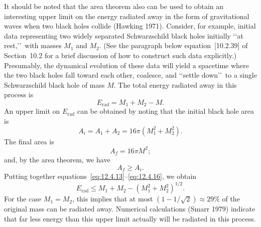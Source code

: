 It should be noted that the area theorem also can be used to obtain an interesting
upper limit on the energy radiated away in the form of gravitational waves when two
black holes collide (Hawking 1971). Consider, for example, initial data representing
two widely separated Schwarzschild black holes initially \lq\lq at rest,\rq\rq\ with
masses \(M_1\) and \(M_2\). (See the paragraph below equation~[10.2.39] of
Section~10.2 for a brief discussion of how to construct such data explicitly.)
Presumably, the dynamical evolution of these data will yield a spacetime where the
two black holes fall toward each other, coalesce, and \lq\lq settle down\rq\rq\ to a
single Schwarzschild black hole of mass \(M\). The total energy radiated away in
this process is
\begin{equation}
 E_{\mathrm{rad}}=M_1+M_2-M .
 \tag{12.4.13}\label{eq:12.4.13}
\end{equation}
An upper limit on \(E_{\mathrm{rad}}\) can be obtained by noting that the initial black
hole area is
\begin{equation}
 A_i=A_1+A_2=16\pi(M_1^2+M_2^2) .
 \tag{12.4.14}\label{eq:12.4.14}
\end{equation}
The final area is
\begin{equation}
 A_f=16\pi M^2 ;
 \tag{12.4.15}\label{eq:12.4.15}
\end{equation}
and, by the area theorem, we have
\begin{equation}
 A_f\geq A_i .
 \tag{12.4.16}\label{eq:12.4.16}
\end{equation}
Putting together equations~\eqref{eq:12.4.13}--\eqref{eq:12.4.16}, we obtain
\begin{equation}
 E_{\mathrm{rad}}\leq M_1+M_2-(M_1^2+M_2^2)^{1/2} .
 \tag{12.4.17}\label{eq:12.4.17}
\end{equation}
For the case \(M_1=M_2\), this implies that at most
\((1-1/\sqrt2)\approx29\%\) of the original mass can be radiated away. Numerical
calculations (Smarr 1979) indicate that far less energy than this upper limit actually
will be radiated in this process.

